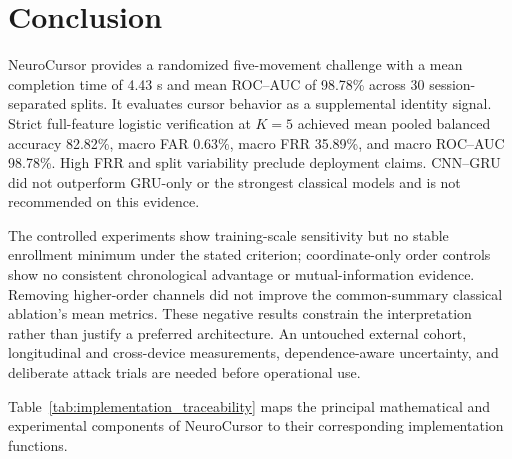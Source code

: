 \documentclass[conference]{IEEEtran}
\begin{document}
\section{Conclusion}

NeuroCursor provides a randomized five-movement challenge with a mean completion
time of 4.43 s and mean ROC--AUC of 98.78\% across 30 session-separated splits.
It evaluates cursor behavior as a supplemental identity signal. Strict full-feature
logistic verification at $K=5$ achieved mean pooled balanced accuracy 82.82\%,
macro FAR 0.63\%, macro FRR 35.89\%, and macro ROC--AUC 98.78\%.
High FRR and split variability preclude deployment claims. CNN--GRU did not
outperform GRU-only or the strongest classical models and is not recommended
on this evidence.

The controlled experiments show training-scale sensitivity but no stable enrollment
minimum under the stated criterion; coordinate-only order controls show no
consistent chronological advantage or mutual-information evidence. Removing
higher-order channels did not improve the common-summary classical ablation's mean
metrics. These negative results constrain the interpretation rather than
justify a preferred architecture. An untouched external cohort, longitudinal
and cross-device measurements, dependence-aware uncertainty, and deliberate
attack trials are needed before operational use.

\FloatBarrier


Table~\ref{tab:implementation_traceability} maps the principal mathematical
and experimental components of NeuroCursor to their corresponding
implementation functions.
\end{document}
